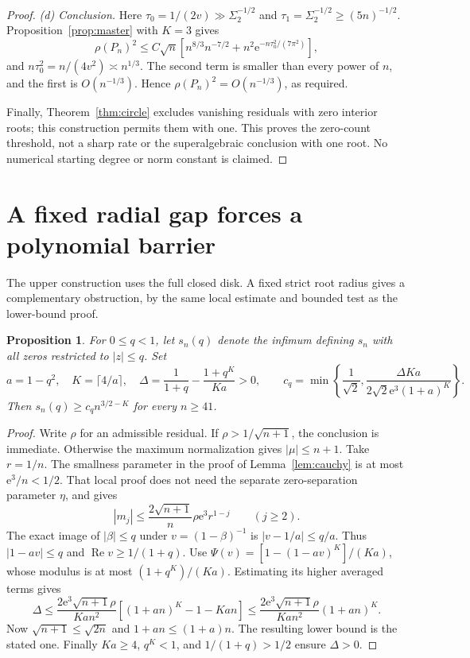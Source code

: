 \documentclass[11pt]{article}
\newtheorem{proposition}[theorem]{Proposition}
\theoremstyle{remark}\newtheorem{remark}[theorem]{Remark}
\newcommand{\Rea}{\operatorname{Re}}
\newcommand{\ee}{\mathrm e}
\begin{document}
\begin{proof}
\emph{(d) Conclusion.} Here \(\tau_0=1/(2v)\gg\Sigma_2^{-1/2}\) and
\(\tau_1=\Sigma_2^{-1/2}\ge(5n)^{-1/2}\). Proposition~\ref{prop:master}
with \(K=3\) gives
\[
 \rho(P_n)^2\le C\sqrt n\left[n^{8/3}n^{-7/2}
 +n^2\ee^{-n\tau_0^2/(7\pi^2)}\right],
\]
and \(n\tau_0^2=n/(4v^2)\asymp n^{1/3}\). The second term is smaller
than every power of \(n\), and the first is \(O(n^{-1/3})\). Hence
\(\rho(P_n)^2=O(n^{-1/3})\), as required.

Finally, Theorem~\ref{thm:circle} excludes vanishing residuals with
zero interior roots; this construction permits them with one.
This proves the zero-count threshold, not a sharp rate or the
superalgebraic conclusion with one root. No numerical starting
degree or norm constant is claimed.
\end{proof}


\section{A fixed radial gap forces a polynomial barrier}\label{sec:radial}
The upper construction uses the full closed disk. A fixed strict
root radius gives a complementary obstruction, by the same local
estimate and bounded test as the lower-bound proof.

\begin{proposition}\label{prop:radial}
For \(0\le q<1\), let \(s_n(q)\) denote the infimum defining \(s_n\)
with all zeros restricted to \(|z|\le q\). Set
\[
 a=1-q^2,\quad K=\lceil4/a\rceil,\quad
 \Delta=\frac1{1+q}-\frac{1+q^K}{Ka}>0,\qquad
 c_q=\min\left\{\frac1{\sqrt2},
       \frac{\Delta Ka}{2\sqrt2\ee^3(1+a)^K}\right\}.
\]
Then \(s_n(q)\ge c_q n^{3/2-K}\) for every \(n\ge41\).
\end{proposition}
\begin{proof}
Write \(\rho\) for an admissible residual. If
\(\rho>1/\sqrt{n+1}\), the conclusion is immediate.
Otherwise the maximum normalization gives \(|\mu|\le n+1\).
Take \(r=1/n\). The smallness parameter in the proof of
Lemma~\ref{lem:cauchy} is at most \(\ee^3/n<1/2\).
That local proof does not need the separate zero-separation
parameter \(\eta\), and gives
\[
 |m_j|\le\frac{2\sqrt{n+1}}n\rho\ee^3 r^{1-j}\qquad(j\ge2).
\]
The exact image of \(|\beta|\le q\) under \(v=(1-\beta)^{-1}\)
is \(|v-1/a|\le q/a\). Thus \(|1-av|\le q\) and
\(\Rea v\ge1/(1+q)\).
Use \(\Psi(v)=[1-(1-av)^K]/(Ka)\), whose modulus is at most
\((1+q^K)/(Ka)\). Estimating its higher averaged terms gives
\[
 \Delta\le\frac{2\ee^3\sqrt{n+1}\rho}{Kan^2}
       [(1+an)^K-1-Kan]
 \le\frac{2\ee^3\sqrt{n+1}\rho}{Kan^2}(1+an)^K.
\]
Now \(\sqrt{n+1}\le\sqrt{2n}\) and \(1+an\le(1+a)n\).
The resulting lower bound is the stated one. Finally \(Ka\ge4\),
\(q^K<1\), and \(1/(1+q)>1/2\) ensure \(\Delta>0\).
\end{proof}
\end{document}

